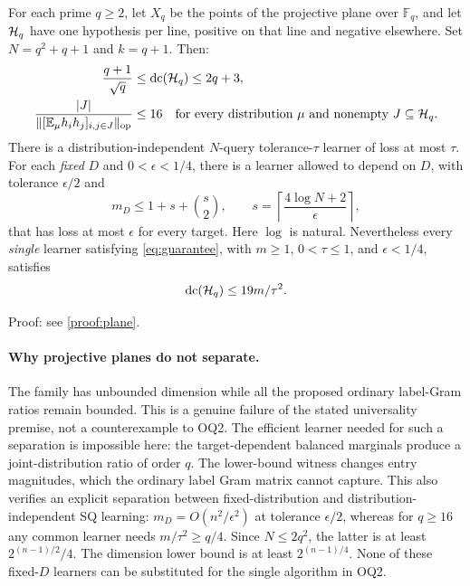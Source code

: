 \begin{theorem}\label{thm:plane}
For each prime $q\geq2$, let $X_q$ be the points of the projective plane over $\mathbb F_q$, and let $\mathcal H_q$ have one hypothesis per line, positive on that line and negative elsewhere. Set $N=q^2+q+1$ and $k=q+1$. Then:
\begin{align}
 \frac{q+1}{\sqrt q}&\leq\operatorname{dc}(\mathcal H_q)\leq2q+3,\label{eq:planedc}\\
 \frac{|J|}{\|[\mathbb E_\mu h_i h_j]_{i,j\in J}\|_{\mathrm{op}}}&\leq16
 \quad\text{for every distribution $\mu$ and nonempty $J\subseteq\mathcal H_q$}.
 \label{eq:planeplain}
\end{align}
There is a distribution-independent $N$-query tolerance-$\tau$ learner of loss at most $\tau$. For each \emph{fixed} $D$ and $0<\epsilon<1/4$, there is a learner allowed to depend on $D$, with tolerance $\epsilon/2$ and
\[
 m_D\leq1+s+\binom{s}{2},\qquad
 s=\left\lceil\frac{4\log N+2}{\epsilon}\right\rceil,
\]
that has loss at most $\epsilon$ for every target. Here $\log$ is natural.
Nevertheless every \emph{single} learner satisfying \eqref{eq:guarantee}, with $m\geq1$, $0<\tau\leq1$, and $\epsilon<1/4$, satisfies
\begin{equation}\label{eq:plane19}
 \operatorname{dc}(\mathcal H_q)\leq19m/\tau^2.
\end{equation}
\end{theorem}

\noindent Proof: see \cref{proof:plane}.\par


\paragraph{Why projective planes do not separate.}
The family has unbounded dimension while all the proposed ordinary label-Gram ratios remain bounded. This is a genuine failure of the stated universality premise, not a counterexample to OQ2. The efficient learner needed for such a separation is impossible here: the target-dependent balanced marginals produce a joint-distribution ratio of order $q$. The lower-bound witness changes entry magnitudes, which the ordinary label Gram matrix cannot capture. This also verifies an explicit separation between fixed-distribution and distribution-independent SQ learning: $m_D=O(n^2/\epsilon^2)$ at tolerance $\epsilon/2$, whereas for $q\geq16$ any common learner needs $m/\tau^2\geq q/4$. Since $N\leq2q^2$, the latter is at least $2^{(n-1)/2}/4$. The dimension lower bound is at least $2^{(n-1)/4}$. None of these fixed-$D$ learners can be substituted for the single algorithm in OQ2.

